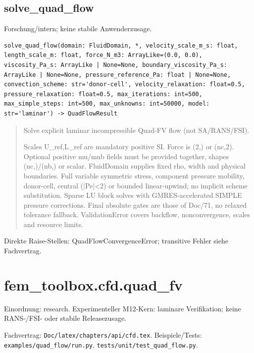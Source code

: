 \subsection{solve\_quad\_flow}
Forschung/intern; keine stabile Anwenderzusage.
\begin{lstlisting}
solve_quad_flow(domain: FluidDomain, *, velocity_scale_m_s: float, length_scale_m: float, force_N_m3: ArrayLike=(0.0, 0.0), viscosity_Pa_s: ArrayLike | None=None, boundary_viscosity_Pa_s: ArrayLike | None=None, pressure_reference_Pa: float | None=None, convection_scheme: str='donor-cell', velocity_relaxation: float=0.5, pressure_relaxation: float=0.5, max_iterations: int=500, max_simple_steps: int=500, max_unknowns: int=50000, model: str='laminar') -> QuadFlowResult
\end{lstlisting}
\begin{quote}
Solve explicit laminar incompressible Quad-FV flow (not SA/RANS/FSI).\par Scales U\_ref,L\_ref are mandatory positive SI. Force is (2,) or (nc,2). Optional positive mu/mub fields must be provided together, shapes (nc,)/(nb,) or scalar. FluidDomain supplies fixed rho, width and physical boundaries. Full variable symmetric stress, component pressure mobility, donor-cell, central (|Pe|<2) or bounded linear-upwind; no implicit scheme substitution. Sparse LU block solves with GMRES-accelerated SIMPLE pressure corrections. Final absolute gates are those of Doc/71, no relaxed tolerance fallback. ValidationError covers backflow, nonconvergence, scales and resource limits.
\end{quote}
Direkte Raise-Stellen: QuadFlowConvergenceError; transitive Fehler siehe Fachvertrag.
\section{fem\_toolbox.cfd.quad\_fv}
Einordnung: research. Experimenteller M12-Kern: laminare Verifikation; keine RANS-/FSI- oder stabile Releasezusage.
\par Fachvertrag: \nolinkurl{Doc/latex/chapters/api/cfd.tex}. Beispiele/Tests:
\nolinkurl{examples/quad_flow/run.py}.
\nolinkurl{tests/unit/test_quad_flow.py}.
